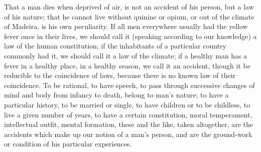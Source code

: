 That a man dies when deprived of air, is not an accident of his
person, but a law of his nature; that he cannot live without quinine
or opium, or out of the climate of Madeira, is his own peculiarity. If
all men everywhere usually had the yellow fever once in their lives,
we should call it (speaking according to our knowledge) a law of the
human constitution; if the inhabitants of a particular country
commonly had it, we should call it a law of the climate; if a healthy
man has a fever in a healthy place, in a healthy season, we call it an
accident, though it be reducible to the coincidence of laws, because
there is no known law of their coincidence. To be rational, to have
speech, to pass through successive changes of mind and body from
infancy to death, belong to man's nature; to have a particular
history, to be married or single, to have children or to be childless,
to live a given number of years, to have a certain constitution, moral
temperament, intellectual outfit, mental formation, these and the
like, taken altogether, are the accidents which make up our notion of
a man's person, and are the ground-work or condition of his
particular experiences.


